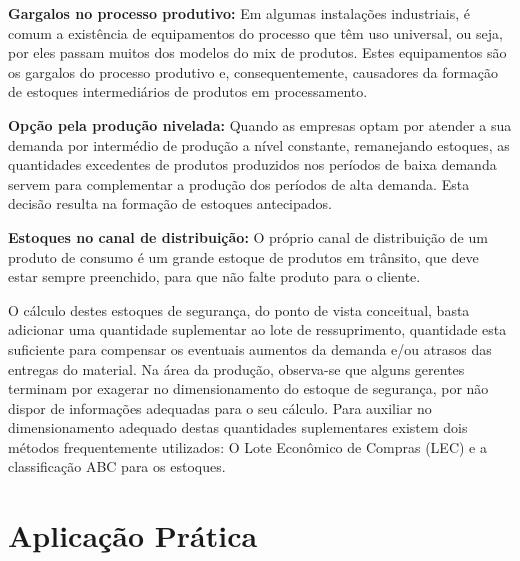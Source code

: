 \textbf{Gargalos no processo produtivo:} Em algumas instalações industriais, é comum a existência de equipamentos do processo que têm uso universal, ou seja, por eles passam muitos dos modelos do mix de produtos. Estes equipamentos são os gargalos do processo produtivo e, consequentemente, causadores da formação de estoques intermediários de produtos em processamento. 

\textbf{Opção pela produção nivelada:} Quando as empresas optam por atender a sua demanda por intermédio de produção a nível constante, remanejando estoques, as quantidades excedentes de produtos produzidos nos períodos de baixa demanda servem para complementar a produção dos períodos de alta demanda. Esta decisão resulta na formação de estoques antecipados.

\textbf{Estoques no canal de distribuição:} O próprio canal de distribuição de um produto de consumo é um grande estoque de produtos em trânsito, que deve estar sempre preenchido, para que não falte produto para o cliente.


O cálculo destes estoques de segurança, do ponto de vista conceitual, basta adicionar uma quantidade suplementar ao lote de ressuprimento, quantidade esta suficiente para compensar os eventuais aumentos da demanda e/ou atrasos das entregas do material. Na área da produção, observa-se que alguns gerentes terminam por exagerar no dimensionamento do estoque de segurança, por não dispor de informações adequadas para o seu cálculo. Para auxiliar no dimensionamento adequado destas quantidades suplementares existem dois métodos frequentemente utilizados: O Lote Econômico de Compras (LEC) e a classificação ABC para os estoques.

\section{Aplicação Prática}
\label{sec:controle_estoques_aplicacao}
